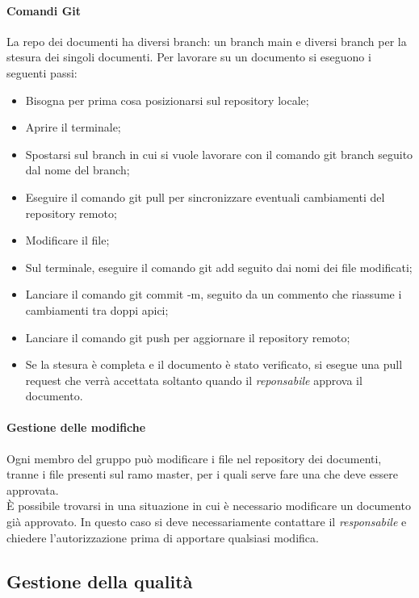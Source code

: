 \documentclass[../norme_di_progetto.tex]{subfiles}
\begin{document}
\paragraph{Comandi Git}
La repo dei documenti ha diversi branch: un branch main e diversi branch per la stesura dei singoli documenti. Per lavorare su un documento si eseguono i seguenti passi:
\begin{itemize}
    \item Bisogna per prima cosa posizionarsi sul repository locale;
    \item Aprire il terminale;
    \item Spostarsi sul branch in cui si vuole lavorare con il comando git branch seguito dal nome del branch;
    \item Eseguire il comando git pull per sincronizzare eventuali cambiamenti del repository remoto;
    \item Modificare il file;
    \item Sul terminale, eseguire il comando git add seguito dai nomi dei file modificati;
    \item Lanciare il comando git commit -m, seguito da un commento che riassume i cambiamenti tra doppi apici;
    \item Lanciare il comando git push per aggiornare il repository remoto;
    \item Se la stesura è completa e il documento è stato verificato, si esegue una pull request che verrà accettata soltanto quando il \emph{reponsabile} approva il documento.
\end{itemize}

\paragraph{Gestione delle modifiche}
Ogni membro del gruppo può modificare i file nel repository dei documenti, tranne i file presenti sul ramo master, per i quali serve fare una  che deve essere approvata.\\
È possibile trovarsi in una situazione in cui è necessario modificare un documento già approvato. In questo caso si deve necessariamente contattare il \emph{responsabile} e chiedere l'autorizzazione prima di apportare qualsiasi modifica.

\subsection{Gestione della qualità}
\end{document}
